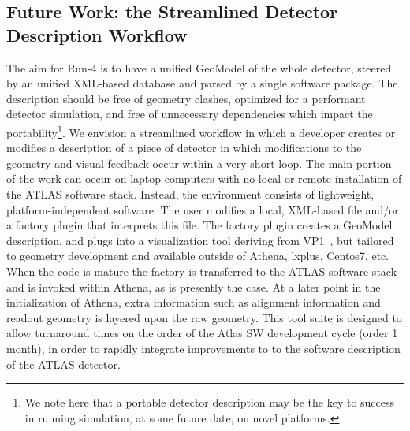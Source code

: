 \subsection{Future Work: the Streamlined Detector Description Workflow}

The aim for Run-4 is to have a unified GeoModel of the whole detector, steered by an unified XML-based database and parsed by a single software package. The description should be free of geometry clashes, optimized for a performant detector simulation, and free of unnecessary dependencies which impact the portability\footnote{We note here that a portable detector description may be the key to success in running simulation, at some future date, on novel platforms.}. We envision a streamlined workflow in which a developer creates or modifies a description of a piece of detector in which modifications to the geometry and visual feedback occur within a very short loop. The main portion of the work can occur on laptop computers with no local or remote installation of the ATLAS software stack. Instead, the environment consists of lightweight, platform-independent software.  The user modifies a local, XML-based file and/or a factory plugin that interprets this file.  The factory plugin creates a GeoModel description, and plugs into a visualization tool deriving from VP1~\cite{ref:vp1-web}, but tailored to geometry development and available outside of Athena, lxplus, Centos7, etc.  When the code is mature the factory is transferred to the ATLAS software stack and is invoked within Athena, as is presently the case.  At a later point in the initialization of Athena, extra information such as alignment information and readout geometry is layered upon the raw geometry. This tool suite is designed to allow turnaround times on the order of the Atlas SW development cycle (order 1 month), in order to rapidly integrate improvements to to the software description of the ATLAS detector. 

